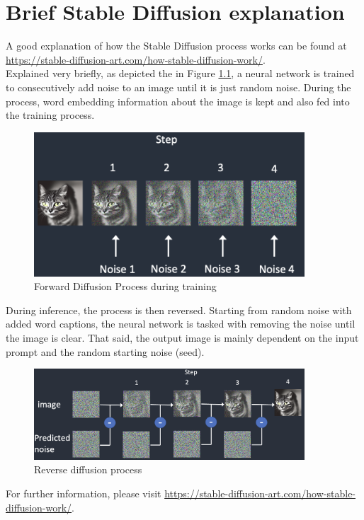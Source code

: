 \documentclass[
  a4paper,  %
  twoside,  %
  bibliography=totoc,
  headsepline,
  cleardoublepage=empty,
  parskip=half,
  draft=false
]{scrbook}
\begin{document}
\chapter{Brief Stable Diffusion explanation}
\label{app:diff-workflow}
A good explanation of how the Stable Diffusion process works can be found at \url{https://stable-diffusion-art.com/how-stable-diffusion-work/}. \\
Explained very briefly, as depicted the in Figure \ref{fig:forward-diff}, a neural network is trained to consecutively add noise to an image until it is just random noise. During the process, word embedding information about the image is kept and also fed into the training process.
\begin{figure}[h]
  \centering
  \includegraphics[width=0.9\textwidth]{./graphics/images/forward-diff.png}
  \caption{Forward Diffusion Process during training \cite{andrewHowDoesStable2022}}
  \label{fig:forward-diff}
\end{figure}

During inference, the process is then reversed. Starting from random noise with added word captions, the neural network is tasked with removing the noise until the image is clear. That said, the output image is mainly dependent on the input prompt and the random starting noise (seed).

\begin{figure}[h]
  \centering
  \includegraphics[width=0.9\textwidth]{./graphics/images/reverse-diff.png}
  \caption{Reverse diffusion process \cite{andrewHowDoesStable2022}}
  \label{fig:backward-diff}
\end{figure}

For further information, please visit \url{https://stable-diffusion-art.com/how-stable-diffusion-work/}.

% 

\pagestyle{empty}
\renewcommand*{\chapterpagestyle}{empty}
\Affirmation
\end{document}
